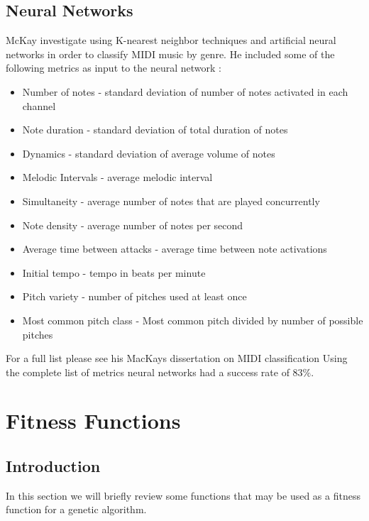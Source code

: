 \section{Neural Networks}
McKay investigate using K-nearest neighbor techniques and artificial neural networks in order to classify \ac{MIDI} music by genre.
He included some of the following metrics as input to the neural network \cite{Mckay2004}:
\begin{itemize}
\item Number of notes - standard deviation of number of notes activated in each channel
\item Note duration - standard deviation of total duration of notes
\item Dynamics - standard deviation of average volume of notes
\item Melodic Intervals - average melodic interval
\item Simultaneity - average number of notes that are played concurrently
\item Note density - average number of notes per second
\item Average time between attacks - average time between note activations
\item Initial tempo - tempo in beats per minute
\item Pitch variety - number of pitches used at least once
\item Most common pitch class - Most common pitch divided by number of possible pitches
\end{itemize}
For a full list please see his MacKays dissertation on MIDI classification \cite{Mckay2004}
Using the complete list of metrics neural networks had a success rate of $83\%$.

\chapter{Fitness Functions}\label{sec:chapfitness}


\section{Introduction}
In this section we will briefly review some functions that may be used as a fitness function for a genetic algorithm.

